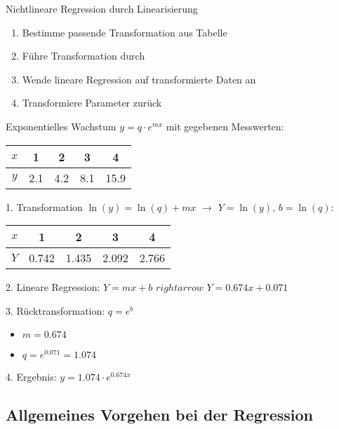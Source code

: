 \begin{KR}{Nichtlineare Regression durch Linearisierung}
\begin{enumerate}
  \item Bestimme passende Transformation aus Tabelle
  \item Führe Transformation durch
  \item Wende lineare Regression auf transformierte Daten an
  \item Transformiere Parameter zurück
\end{enumerate}
\end{KR}

\begin{example2}{Exponentielles Wachstum} $y=q \cdot e^{mx}$
mit gegebenen Messwerten:
\begin{center}
\begin{tabular}{|c|c|c|c|c|}
\hline
$x$ & 1 & 2 & 3 & 4 \\
\hline
$y$ & 2.1 & 4.2 & 8.1 & 15.9 \\
\hline
\end{tabular}
\end{center}

1. Transformation $\ln(y)=\ln(q)+mx$ $\rightarrow$ $Y=\ln(y)$, $b=\ln(q)$:
\begin{center}
\begin{tabular}{|c|c|c|c|c|}
\hline
$x$ & 1 & 2 & 3 & 4 \\
\hline
$Y$ & 0.742 & 1.435 & 2.092 & 2.766 \\
\hline
\end{tabular}
\end{center}

2. Lineare Regression: $Y=mx+b$ $rightarrow$ $Y = 0.674x + 0.071$

3. Rücktransformation: $q=e^b$
   \begin{itemize}
     \item $m = 0.674$
     \item $q = e^{0.071} = 1.074$
   \end{itemize}

4. Ergebnis: $y = 1.074 \cdot e^{0.674x}$
\end{example2}

\subsection{Allgemeines Vorgehen bei der Regression}

